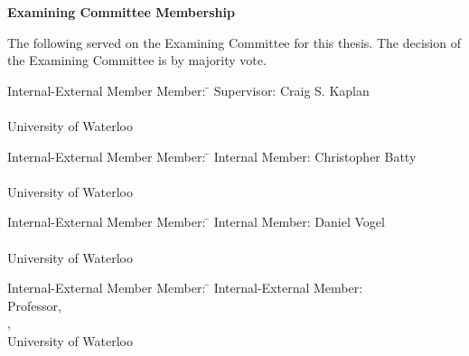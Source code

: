 \pagestyle{plain}
\setcounter{page}{2}

\cleardoublepage %

 
\begin{center}\textbf{Examining Committee Membership}\end{center}
  \noindent
The following served on the Examining Committee for this thesis. The decision of the Examining Committee is by majority vote.
  \bigskip
  

  
  \noindent
\begin{tabbing}
Internal-External Member Member: \=  \kill %
Supervisor: \> Craig S. Kaplan \\
\>  \\ 
\> University of Waterloo \\
\end{tabbing}
  \bigskip
  
  \noindent
  \begin{tabbing}
Internal-External Member Member: \=  \kill %
Internal Member: \> Christopher Batty \\
\>  \\ 
\> University of Waterloo \\
\end{tabbing}
  \bigskip

    \noindent
\begin{tabbing}
Internal-External Member Member: \=  \kill %
Internal Member: \> Daniel Vogel \\
\>  \\ 
\> University of Waterloo \\
\end{tabbing}
 \bigskip
  
  \noindent
\begin{tabbing}
Internal-External Member Member: \=  \kill %
Internal-External Member: \>  \\
\> Professor, \\ 
\> , \\
\> University of Waterloo \\
\end{tabbing}
  \bigskip

